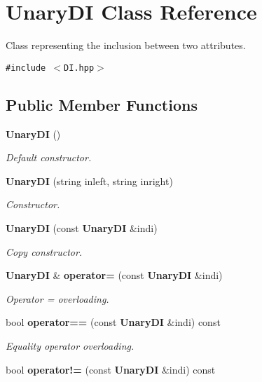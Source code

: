 \section{Unary\-DI Class Reference}
\label{class_unary_d_i}
Class representing the inclusion between two attributes.  


{\tt \#include $<$DI.hpp$>$}

\subsection*{Public Member Functions}
\begin{CompactItemize}
\item 
{\bf Unary\-DI} ()\label{class_unary_d_i_ca11c2618c698af3b4a863cc09774ea9}

\begin{CompactList}\small\item\em Default constructor. \item\end{CompactList}\item 
{\bf Unary\-DI} (string inleft, string inright)\label{class_unary_d_i_e4cf260dec2ebeff29dd9b7faf54e6eb}

\begin{CompactList}\small\item\em Constructor. \item\end{CompactList}\item 
{\bf Unary\-DI} (const {\bf Unary\-DI} \&indi)\label{class_unary_d_i_9b8b891bbdf8ea060e8027cb4adb752b}

\begin{CompactList}\small\item\em Copy constructor. \item\end{CompactList}\item 
{\bf Unary\-DI} \& {\bf operator=} (const {\bf Unary\-DI} \&indi)\label{class_unary_d_i_9fa01d3555cc333f3aa71371d1f33c77}

\begin{CompactList}\small\item\em Operator = overloading. \item\end{CompactList}\item 
bool {\bf operator==} (const {\bf Unary\-DI} \&indi) const \label{class_unary_d_i_fb7708708b8183cba45cbccbf90bfe74}

\begin{CompactList}\small\item\em Equality operator overloading. \item\end{CompactList}\item 
bool {\bf operator!=} (const {\bf Unary\-DI} \&indi) const \label{class_unary_d_i_dc0c43c463b82e0be03634e55cff0c21}


\end{CompactItemize}
